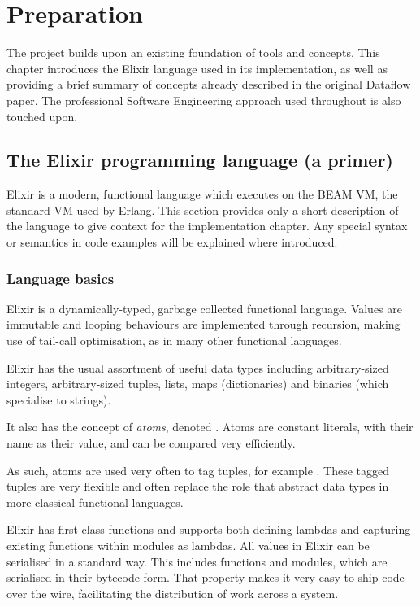 \chapter{Preparation}\label{ch:prep}

The project builds upon an existing foundation of tools and concepts.
This chapter introduces the Elixir language used in its implementation, as well as providing a brief summary of concepts already described in the original Dataflow paper.
The professional Software Engineering approach used throughout is also touched upon.

\section{The Elixir programming language (a primer)}\label{sec:prep:elixir}

Elixir is a modern, functional language which executes on the BEAM VM, the standard VM used by Erlang.
This section provides only a short description of the language to give context for the implementation chapter.
Any special syntax or semantics in code examples will be explained where introduced.

\subsection{Language basics}

Elixir is a dynamically-typed, garbage collected functional language.
Values are immutable and looping behaviours are implemented through recursion, making use of tail-call optimisation, as in many other functional languages.

Elixir has the usual assortment of useful data types including arbitrary-sized integers, arbitrary-sized tuples, lists, maps (dictionaries) and binaries (which specialise to strings).

It also has the concept of \emph{atoms}, denoted .
Atoms are constant literals, with their name as their value, and can be compared very efficiently.

As such, atoms are used very often to tag tuples, for example .
These tagged tuples are very flexible and often replace the role that abstract data types in more classical functional languages.

Elixir has first-class functions and supports both defining lambdas and capturing existing functions within modules as lambdas.
All values in Elixir can be serialised in a standard way.
This includes functions and modules, which are serialised in their bytecode form.
That property makes it very easy to ship code over the wire, facilitating the distribution of work across a system.

